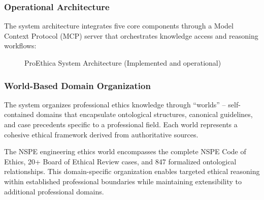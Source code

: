 \subsubsection{Operational Architecture}

The system architecture integrates five core components through a Model Context Protocol (MCP) server that orchestrates knowledge access and reasoning workflows:

\begin{figure}[htbp]
\centering
\caption{ProEthica System Architecture (Implemented and operational)}
\label{fig:system-architecture}
\end{figure}

\subsubsection{World-Based Domain Organization}

The system organizes professional ethics knowledge through ``worlds'' -- self-contained domains that encapsulate ontological structures, canonical guidelines, and case precedents specific to a professional field. Each world represents a cohesive ethical framework derived from authoritative sources.

The NSPE engineering ethics world encompasses the complete NSPE Code of Ethics, 20+ Board of Ethical Review cases, and 847 formalized ontological relationships. This domain-specific organization enables targeted ethical reasoning within established professional boundaries while maintaining extensibility to additional professional domains.


